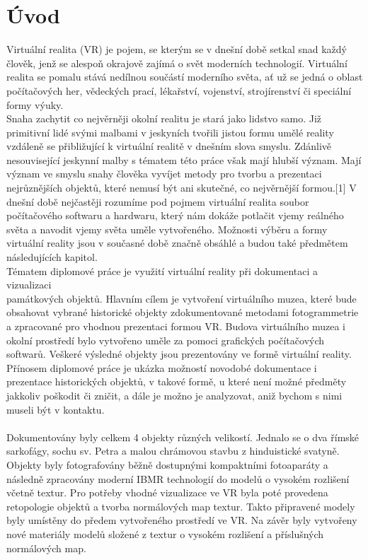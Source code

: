\documentclass[a4paper, 12pt]{report}
\begin{document}
\chapter{Úvod}
Virtuální realita (VR) je pojem, se kterým se v dnešní době setkal snad každý člověk, jenž se alespoň okrajově zajímá o svět moderních technologií. Virtuální realita se pomalu stává nedílnou součástí moderního světa, ať už se jedná o oblast počítačových her, vědeckých prací, lékařství, vojenství, strojírenství či speciální formy výuky.\\
Snaha zachytit co nejvěrněji okolní realitu je stará jako lidstvo samo. Již primitivní lidé svými malbami v jeskyních tvořili jistou formu umělé reality vzdáleně se přibližující k virtuální realitě v dnešním slova smyslu. Zdánlivě nesouvisející jeskynní malby s tématem této práce však mají hlubší význam. Mají význam ve smyslu snahy člověka vyvíjet metody pro tvorbu a prezentaci nejrůznějších objektů, které nemusí být ani skutečné, co nejvěrnější formou.[1] V dnešní době nejčastěji rozumíme pod pojmem virtuální realita soubor počítačového softwaru a hardwaru, který nám dokáže potlačit vjemy reálného světa a navodit vjemy světa uměle vytvořeného. Možnosti výběru a formy virtuální reality jsou v současné době značně obsáhlé a budou také předmětem následujících kapitol.\\
Tématem diplomové práce je využití virtuální reality při dokumentaci a vizualizaci \\památkových objektů. Hlavním cílem je vytvoření virtuálního muzea, které bude obsahovat vybrané historické objekty zdokumentované metodami fotogrammetrie a zpracované pro vhodnou prezentaci formou VR. Budova virtuálního muzea i okolní prostředí bylo vytvořeno uměle za pomoci grafických počítačových softwarů. Veškeré výsledné objekty jsou prezentovány ve formě virtuální reality. Přínosem diplomové práce je ukázka možností novodobé dokumentace i prezentace historických objektů, v takové formě, u které není možné předměty jakkoliv poškodit či zničit, a dále je možno je analyzovat, aniž bychom s nimi museli být v kontaktu.\\
\\
Dokumentovány byly celkem 4 objekty různých velikostí. Jednalo se o dva římské sarkofágy, sochu sv. Petra a malou chrámovou stavbu z hinduistické svatyně. Objekty byly fotografovány běžně dostupnými kompaktními fotoaparáty a následně zpracovány moderní IBMR technologií do modelů o vysokém rozlišení včetně textur. Pro potřeby vhodné vizualizace ve VR byla poté provedena retopologie objektů a tvorba normálových map textur. Takto připravené modely byly umístěny do předem vytvořeného prostředí ve VR. Na závěr byly vytvořeny nové materiály modelů složené z textur o vysokém rozlišení a příslušných normálových map.\\
\end{document}
